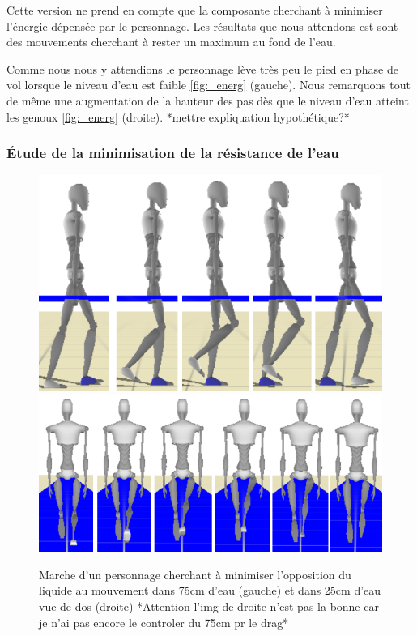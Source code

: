 \documentclass[runningheads,a4paper]{llncs}
\begin{document}
Cette version ne prend en compte que la composante cherchant à minimiser l'énergie dépensée par le personnage. Les résultats que nous attendons est sont des mouvements cherchant à rester un maximum au fond de l'eau.

Comme nous nous y attendions le personnage lève très peu le pied en phase de vol lorsque le niveau d'eau est faible \ref{fig:_energ} (gauche). Nous remarquons tout de même une augmentation de la hauteur des pas dès que le niveau d'eau atteint les genoux \ref{fig:_energ} (droite). *mettre expliquation hypothétique?*

\subsubsection{Étude de la minimisation de la résistance de l'eau}

\begin{figure}[h]
\centering
\includegraphics[scale=0.5]{strips/min_torque_75cm.png}
\includegraphics[scale=0.37]{strips/min_drag_25cm_from_back.png}
\caption{Marche d'un personnage cherchant à minimiser l'opposition du liquide au mouvement dans 75cm d'eau (gauche) et dans 25cm d'eau vue de dos (droite) *Attention l'img de droite n'est pas la bonne car je n'ai pas encore le controler du 75cm pr le drag*}
\label{fig:min_drag2}
\end{figure}
\end{document}
